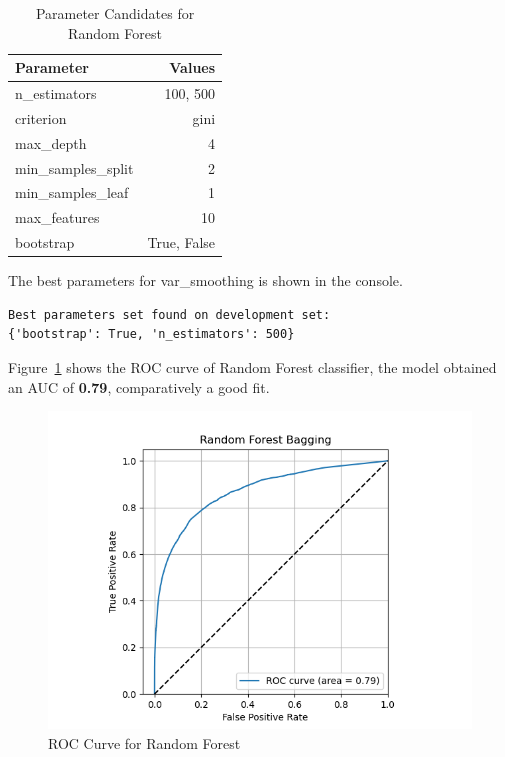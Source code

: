 \begin{table}[h]
\centering
\begin{tabular}{|l|r|}
\hline
\textbf{Parameter}        & \textbf{Values}         \\ \hline
n\_estimators             & 100, 500                \\ \hline
criterion                 & gini                    \\ \hline
max\_depth                & 4                       \\ \hline
min\_samples\_split       & 2                       \\ \hline
min\_samples\_leaf        & 1                       \\ \hline
max\_features             & 10                      \\ \hline
bootstrap                 & True, False             \\ \hline
\end{tabular}
\caption{Parameter Candidates for Random Forest}
\label{tab:parameters-rf}
\end{table}

The best parameters for var\_smoothing is shown in the console.

\begin{verbatim}
Best parameters set found on development set:
{'bootstrap': True, 'n_estimators': 500}
\end{verbatim}

Figure~\ref{fig:roc-rf} shows the ROC curve of Random Forest classifier, the model obtained an AUC of \textbf{0.79}, comparatively a good fit.

\begin{figure}
    \centering
    \includegraphics[width=1\linewidth]{docs//assets/individual_roc_curve_Random Forest Bagging.png}
    \caption{ROC Curve for Random Forest}
    \label{fig:roc-rf}
\end{figure}


